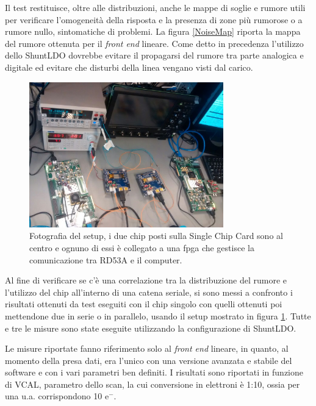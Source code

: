 Il test restituisce, oltre alle distribuzioni, anche le mappe di soglie e rumore utili per verificare l'omogeneità della risposta e la presenza di zone più rumorose o a rumore nullo, sintomatiche di problemi.
La figura \ref{NoiseMap} riporta la mappa del rumore ottenuta per il \textit{front end} lineare. 
Come detto in precedenza l'utilizzo dello ShuntLDO dovrebbe evitare il propagarsi del rumore tra parte analogica e digitale ed evitare che disturbi della linea vengano visti dal carico. 
\begin{figure}
\centering
\includegraphics[width=0.75\textwidth]{Immagini/chipserial}
\caption{Fotografia del setup, i due chip posti sulla Single Chip Card sono al centro e ognuno di essi è collegato a una fpga che gestisce la comunicazione tra RD53A e il computer.}
\label{chipserial}
\end{figure}
Al fine di verificare se c'è una correlazione tra la distribuzione del rumore e l'utilizzo del chip all'interno di una catena seriale, si sono messi a confronto i risultati ottenuti da test eseguiti con il chip singolo con quelli ottenuti poi mettendone due in serie o in parallelo, usando il setup mostrato in figura \ref{chipserial}.
Tutte e tre le misure sono state eseguite utilizzando la configurazione di ShuntLDO. 

Le misure riportate fanno riferimento solo al \textit{front end} lineare, in quanto, al momento della presa dati, era l'unico con una versione avanzata e stabile del software e con i vari parametri ben definiti.
I risultati sono riportati in funzione di VCAL, parametro dello scan, la cui conversione in elettroni è 1:10, ossia per una u.a. corrispondono 10 $\mathrm{e^{-}}$.

